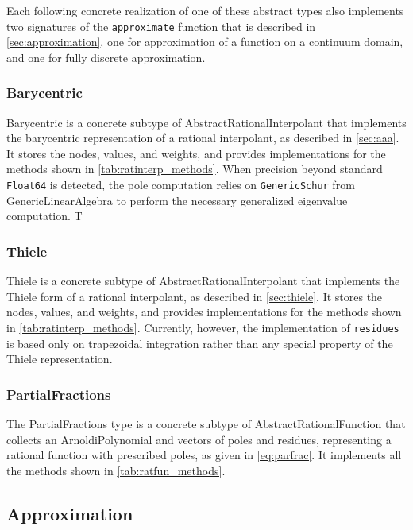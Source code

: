 \documentclass{juliacon}
\begin{document}
Each following concrete realization of one of these abstract types also implements two signatures of the \texttt{approximate} function that is described in \autoref{sec:approximation}, one for approximation of a function on a continuum domain, and one for fully discrete approximation.

\subsubsection{Barycentric}

\textsf{Barycentric} is a concrete subtype of \textsf{AbstractRationalInterpolant} that implements the barycentric representation of a rational interpolant, as described in \autoref{sec:aaa}. It stores the nodes, values, and weights, and provides implementations for the methods shown in \autoref{tab:ratinterp_methods}. When precision beyond standard \verb|Float64| is detected, the pole computation relies on \texttt{GenericSchur} from \textsf{GenericLinearAlgebra} to perform the necessary generalized eigenvalue computation. T

\subsubsection{Thiele}

\textsf{Thiele} is a concrete subtype of \textsf{AbstractRationalInterpolant} that implements the Thiele form of a rational interpolant, as described in \autoref{sec:thiele}. It stores the nodes, values, and weights, and provides implementations for the methods shown in \autoref{tab:ratinterp_methods}. Currently, however, the implementation of \verb|residues| is based only on trapezoidal integration rather than any special property of the Thiele representation. 

\subsubsection{PartialFractions}

The \textsf{PartialFractions} type is a concrete subtype of \textsf{AbstractRationalFunction} that collects an \textsf{ArnoldiPolynomial} and vectors of poles and residues, representing a rational function with prescribed poles, as given in \autoref{eq:parfrac}. It implements all the methods shown in \autoref{tab:ratfun_methods}. 

\subsection{Approximation}
\label{sec:approximation}
\end{document}
